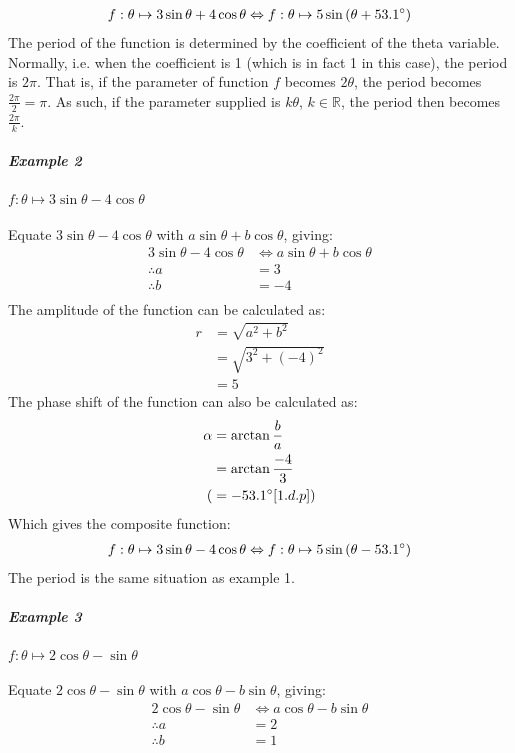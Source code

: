 \documentclass{article}
\begin{document}
        \begin{align*}
            f:\theta \mapsto 3\sin{\theta} + 4\cos{\theta} \Leftrightarrow f:\theta \mapsto 5\sin{(\theta + 53.1\degree)}
        \end{align*}
		The period of the function is determined by the coefficient of the theta variable. Normally, i.e. when the coefficient is 1 (which is in fact 1 in this case), the period is $2\pi$. That is, if the parameter of function $f$ becomes $2\theta$, the period becomes $\frac{2\pi}{2} = \pi$. As such, if the parameter supplied is $k\theta$, $k \in \mathbb{R}$, the period then becomes $\frac{2\pi}{k}$. \\
		\subparagraph{Example 2} $f:\theta \mapsto 3\sin{\theta} - 4\cos{\theta}$ \\\\
		Equate $3\sin{\theta} - 4\cos{\theta}$ with $a\sin{\theta} + b\cos{\theta}$, giving:
		\begin{align*}
		3\sin{\theta} - 4\cos{\theta} &\Leftrightarrow a\sin{\theta} + b\cos{\theta} \\
		\therefore a &= 3 \\
		\therefore b &= -4 \\
		\end{align*}
		The amplitude of the function can be calculated as:
		\begin{align*}
		r &= \sqrt{a^2 + b^2} \\
		&= \sqrt{3^2 + (-4)^2} \\
		&= 5
		\end{align*}
		The phase shift of the function can also be calculated as:
		\begin{align*}
		\alpha &= \arctan{\frac{b}{a}} \\
		&= \arctan{\frac{-4}{3}} \\
		(&= -53.1\degree [1.d.p]) 
		\end{align*}
        Which gives the composite function:
        \begin{align*}
        f:\theta \mapsto 3\sin{\theta} - 4\cos{\theta} \Leftrightarrow f:\theta \mapsto 5\sin{(\theta - 53.1\degree)}
        \end{align*}
        The period is the same situation as example 1. \\
        \subparagraph{Example 3} $f:\theta \mapsto 2\cos{\theta} - \sin{\theta}$ \\\\
        Equate $2\cos{\theta} - \sin{\theta}$ with $a\cos{\theta} - b\sin{\theta}$, giving:
        \begin{align*}
        2\cos{\theta} - \sin{\theta} &\Leftrightarrow a\cos{\theta} - b\sin{\theta} \\
        \therefore a &= 2 \\
        \therefore b &= 1
        \end{align*}
\end{document}
